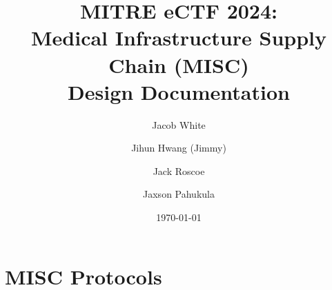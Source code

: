 \documentclass{article}
\title{MITRE eCTF 2024:\\ \Large Medical Infrastructure Supply Chain (MISC)\\Design Documentation}
\author{\large Jacob White}
\author{\large Jihun Hwang (Jimmy)}
\author{\large Jack Roscoe}
\author{\large Jaxson Pahukula}
\affil{\normalsize Purdue University (\texttt{b01lers})}
\date{\small \today}
\newif\iflong
\newcommand{\jw}[1]{\iflong\textcolor{Purple}{#1 ---Jacob}\fi}
\begin{document}
\maketitle














\section{MISC Protocols}
\label{sec:MISC}













\newpage



\newpage

\end{document}
